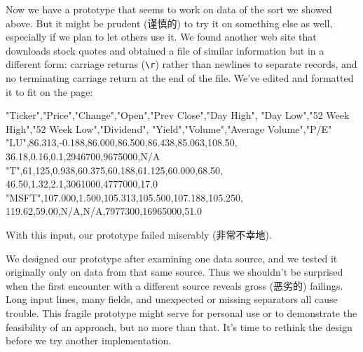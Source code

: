 Now we have a prototype that seems to work on data of the sort we showed
above.  But it might be prudent (谨慎的) to try it on something else as
well, especially if we plan to let others use it. We found another web site
that downloads stock quotes and obtained a file of similar information but
in a different form: carriage returns (\verb'\r') rather than newlines to
separate records, and no terminating carriage return at the end of the
file.  We've edited and formatted it to fit on the page:
\begin{wellcode}
    "Ticker","Price","Change","Open","Prev Close","Day High",
        "Day Low","52 Week High","52 Week Low","Dividend",
        "Yield","Volume","Average Volume","P/E"
    "LU",86.313,-0.188,86.000,86.500,86.438,85.063,108.50,
        36.18,0.16,0.1,2946700,9675000,N/A
    "T",61,125,0.938,60.375,60.188,61.125,60.000,68.50,
        46.50,1.32,2.1,3061000,4777000,17.0
    "MSFT",107.000,1.500,105.313,105.500,107.188,105.250,
        119.62,59.00,N/A,N/A,7977300,16965000,51.0
\end{wellcode}
With this input, our prototype failed miserably (非常不幸地).

We designed our prototype after examining one data source, and we tested it
originally only on data from that same source. Thus we shouldn't be
surprised when the first encounter with a different source reveals gross
(恶劣的) failings. Long input lines, many fields, and unexpected or missing
separators all cause trouble. This fragile prototype might serve for
personal use or to demonstrate the feasibility of an approach, but no more
than that. It's time to rethink the design before we try another
implementation.

